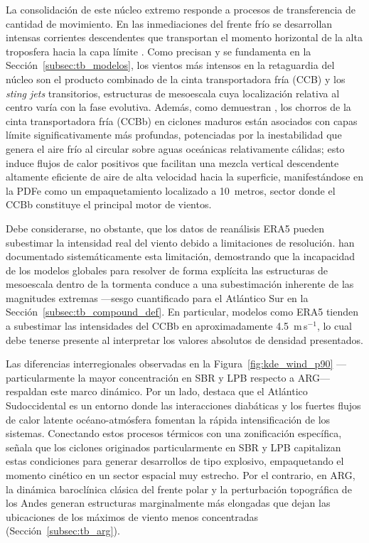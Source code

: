 La consolidación de este núcleo extremo responde a procesos de transferencia de cantidad de movimiento. En las inmediaciones del frente frío se desarrollan intensas corrientes descendentes que transportan el momento horizontal de la alta troposfera hacia la capa límite \citep{hyeok2024extrem}. Como precisan \citet{martinez2014cold} y se fundamenta en la Sección~\ref{subsec:tb_modelos}, los vientos más intensos en la retaguardia del núcleo son el producto combinado de la cinta transportadora fría (CCB) y los \textit{sting jets} transitorios, estructuras de mesoescala cuya localización relativa al centro varía con la fase evolutiva. Además, como demuestran \citet{gentile2023observed}, los chorros de la cinta transportadora fría (CCBb) en ciclones maduros están asociados con capas límite significativamente más profundas, potenciadas por la inestabilidad que genera el aire frío al circular sobre aguas oceánicas relativamente cálidas; esto induce flujos de calor positivos que facilitan una mezcla vertical descendente altamente eficiente de aire de alta velocidad hacia la superficie, manifestándose en la PDFe como un empaquetamiento localizado a 10~metros, sector donde el CCBb constituye el principal motor de vientos.

Debe considerarse, no obstante, que los datos de reanálisis ERA5 pueden subestimar la intensidad real del viento debido a limitaciones de resolución. \citet{priestley2022improved} han documentado sistemáticamente esta limitación, demostrando que la incapacidad de los modelos globales para resolver de forma explícita las estructuras de mesoescala dentro de la tormenta conduce a una subestimación inherente de las magnitudes extremas ---sesgo cuantificado para el Atlántico Sur en la Sección~\ref{subsec:tb_compound_def}. En particular, modelos como ERA5 tienden a subestimar las intensidades del CCBb en aproximadamente 4.5~m\,s$^{-1}$, lo cual debe tenerse presente al interpretar los valores absolutos de densidad presentados.

Las diferencias interregionales observadas en la Figura~\ref{fig:kde_wind_p90} ---particularmente la mayor concentración en SBR y LPB respecto a ARG--- respaldan este marco dinámico. Por un lado, \citet{reboita2018extratropical} destaca que el Atlántico Sudoccidental es un entorno donde las interacciones diabáticas y los fuertes flujos de calor latente océano-atmósfera fomentan la rápida intensificación de los sistemas. Conectando estos procesos térmicos con una zonificación específica, \citet{gramcianinov2023impact} señala que los ciclones originados particularmente en SBR y LPB capitalizan estas condiciones para generar desarrollos de tipo explosivo, empaquetando el momento cinético en un sector espacial muy estrecho. Por el contrario, en ARG, la dinámica baroclínica clásica del frente polar y la perturbación topográfica de los Andes generan estructuras marginalmente más elongadas que dejan las ubicaciones de los máximos de viento menos concentradas (Sección~\ref{subsec:tb_arg}).

